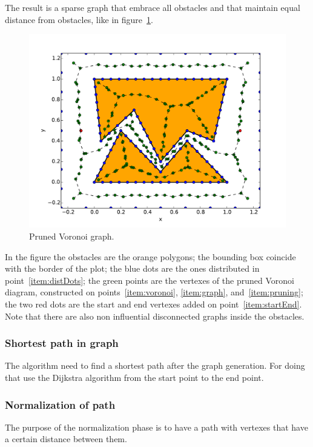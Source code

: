 \documentclass[a4paper]{article}
\begin{document}
The result is a sparse
graph that embrace all obstacles and that maintain equal distance from
obstacles, like in figure~\ref{fig:voronoi}.
\begin{figure}[htb]
  \centering
  \includegraphics[width=\textwidth]{img/voronoi.pdf}
  \caption{Pruned Voronoi graph.}
  \label{fig:voronoi}
\end{figure}

In the figure the obstacles are the orange polygons; the bounding box
coincide with the border of the plot; the blue dots are the ones
distributed in point~\ref{item:distDots}; the green points are the
vertexes of the pruned Voronoi diagram, constructed on
points~\ref{item:voronoi}, \ref{item:graph}, and~\ref{item:pruning};
the two red dots are the start and end vertexes added on point~\ref{item:startEnd}.
Note that there are also non influential disconnected graphs inside
the obstacles.

\subsubsection{Shortest path in graph}
The algorithm need to find a shortest path after the graph
generation. For doing that use the Dijkstra algorithm from the start
point to the end point.

\subsubsection{Normalization of path}
The purpose of the normalization phase is to have a path with vertexes
that have a certain distance between them.
\end{document}

